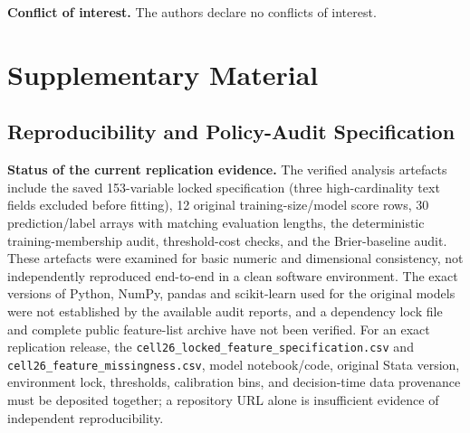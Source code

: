 \documentclass[10pt]{article}
\begin{document}
 \noindent\textbf{Conflict of interest.} The authors declare no conflicts of interest.


\section{Supplementary Material}


\subsection{Reproducibility and Policy-Audit Specification}
\label{app:repro}

\noindent\textbf{Status of the current replication evidence.} The verified analysis artefacts include the saved 153-variable locked specification (three high-cardinality text fields excluded before fitting), 12 original training-size/model score rows, 30 prediction/label arrays with matching evaluation lengths, the deterministic training-membership audit, threshold-cost checks, and the Brier-baseline audit. These artefacts were examined for basic numeric and dimensional consistency, not independently reproduced end-to-end in a clean software environment. The exact versions of Python, NumPy, pandas and scikit-learn used for the original models were not established by the available audit reports, and a dependency lock file and complete public feature-list archive have not been verified. For an exact replication release, the \texttt{cell26\_locked\_feature\_specification.csv} and \texttt{cell26\_feature\_missingness.csv}, model notebook/code, original Stata version, environment lock, thresholds, calibration bins, and decision-time data provenance must be deposited together; a repository URL alone is insufficient evidence of independent reproducibility.
\end{document}
